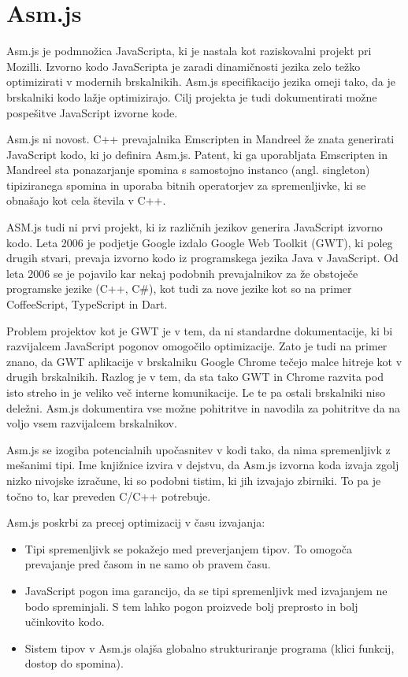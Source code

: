 \chapter{Asm.js}
\label{sec:asm}
Asm.js \cite{asm} je podmnožica JavaScripta, ki je nastala kot raziskovalni projekt pri Mozilli. Izvorno kodo JavaScripta je zaradi dinamičnosti jezika zelo težko optimizirati v modernih brskalnikih. Asm.js specifikacijo jezika omeji tako, da je brskalniki kodo lažje optimizirajo. Cilj projekta je tudi dokumentirati možne pospešitve JavaScript izvorne kode.

Asm.js ni novost. C++ prevajalnika Emscripten in Mandreel že znata generirati JavaScript kodo, ki jo definira Asm.js. Patent, ki ga uporabljata Emscripten in Mandreel sta ponazarjanje spomina s samostojno instanco (angl. singleton) tipiziranega spomina in uporaba bitnih operatorjev za spremenljivke, ki se obnašajo kot cela števila v C++.

ASM.js tudi ni prvi projekt, ki iz različnih jezikov generira JavaScript izvorno kodo. Leta 2006 je podjetje Google izdalo Google Web Toolkit (GWT), ki poleg drugih stvari, prevaja izvorno kodo iz programskega jezika Java v JavaScript. Od leta 2006 se je pojavilo kar nekaj podobnih prevajalnikov za že obstoječe programske jezike (C++, C\#), kot tudi za nove jezike kot so na primer CoffeeScript, TypeScript in Dart.

Problem projektov kot je GWT je v tem, da ni standardne dokumentacije, ki bi razvijalcem JavaScript pogonov omogočilo optimizacije. Zato je tudi na primer znano, da GWT aplikacije v brskalniku Google Chrome tečejo malce hitreje kot v drugih brskalnikih. Razlog je v tem, da sta tako GWT in Chrome razvita pod isto streho in je veliko več interne komunikacije. Le te pa ostali brskalniki niso deležni. Asm.js dokumentira vse možne pohitritve in navodila za pohitritve da na voljo vsem razvijalcem brskalnikov.

Asm.js se izogiba potencialnih upočasnitev v kodi tako, da nima spremenljivk z mešanimi tipi. Ime knjižnice izvira v dejstvu, da Asm.js izvorna koda izvaja zgolj nizko nivojske izračune, ki so podobni tistim, ki jih izvajajo zbirniki. To pa je točno to, kar preveden C/C++ potrebuje.

Asm.js poskrbi za precej optimizacij v času izvajanja:

\begin{itemize}
\item Tipi spremenljivk se pokažejo med preverjanjem tipov. To omogoča prevajanje pred časom in ne samo ob pravem času.
\item JavaScript pogon ima garancijo, da se tipi spremenljivk med izvajanjem ne bodo spreminjali. S tem lahko pogon proizvede bolj preprosto in bolj učinkovito kodo. 
\item Sistem tipov v Asm.js olajša globalno strukturiranje programa (klici funkcij, dostop do spomina).
\end{itemize}

